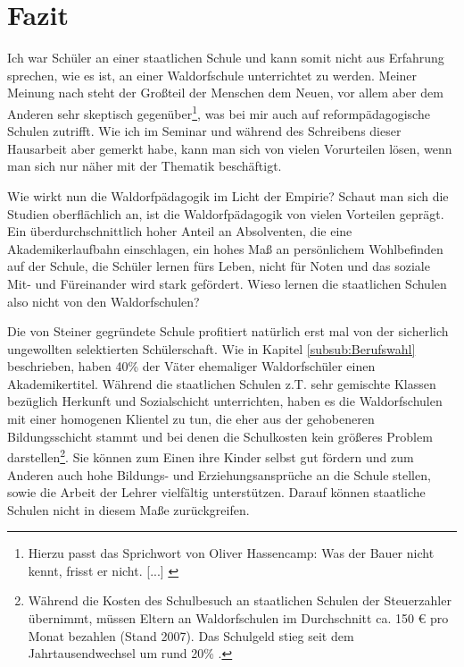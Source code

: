 \section{Fazit}

Ich war Schüler an einer staatlichen Schule und kann somit nicht aus Erfahrung sprechen, wie es ist, an einer Waldorfschule unterrichtet zu werden. Meiner Meinung nach steht der Großteil der Menschen dem Neuen, vor allem aber dem Anderen sehr skeptisch gegenüber\footnote{Hierzu passt das Sprichwort von Oliver Hassencamp: Was der Bauer nicht kennt, frisst er nicht. [...] \citep[Vgl.][]{roschk13}}, was bei mir auch auf reformpädagogische Schulen zutrifft. 
Wie ich im Seminar und während des Schreibens dieser Hausarbeit aber  gemerkt habe, kann man sich von vielen Vorurteilen lösen, wenn man sich nur näher mit der Thematik beschäftigt.

Wie wirkt nun die Waldorfpädagogik im Licht der Empirie? Schaut man sich die Studien oberflächlich an, ist die Waldorfpädagogik von vielen Vorteilen geprägt. Ein überdurchschnittlich hoher Anteil an Absolventen, die eine Akademikerlaufbahn einschlagen, ein hohes Maß an persönlichem Wohlbefinden auf der Schule, die Schüler lernen fürs Leben, nicht für Noten und das soziale Mit- und Füreinander wird stark gefördert. Wieso lernen die staatlichen Schulen also nicht von den Waldorfschulen?

Die von Steiner gegründete Schule profitiert natürlich erst mal von der sicherlich ungewollten selektierten Schülerschaft. Wie in Kapitel \ref{subsub:Berufswahl} beschrieben, haben 40\% der Väter ehemaliger Waldorfschüler einen Akademikertitel. Während die staatlichen Schulen z.T. sehr gemischte Klassen bezüglich Herkunft und Sozialschicht unterrichten, haben es die Waldorfschulen mit einer homogenen Klientel zu tun, die eher aus der gehobeneren Bildungsschicht stammt und bei denen die Schulkosten kein größeres Problem darstellen\footnote{Während die Kosten des Schulbesuch an staatlichen Schulen der Steuerzahler übernimmt, müssen Eltern an Waldorfschulen im Durchschnitt ca. 150 € pro Monat bezahlen (Stand 2007). Das Schulgeld stieg seit dem Jahrtausendwechsel um rund 20\% \citep[vgl.][]{mannheim09}.}. Sie können zum Einen ihre Kinder selbst gut fördern und zum Anderen auch hohe Bildungs- und Erziehungsansprüche an die Schule stellen, sowie die Arbeit der Lehrer vielfältig unterstützen. Darauf können staatliche Schulen nicht in diesem Maße zurückgreifen. 

